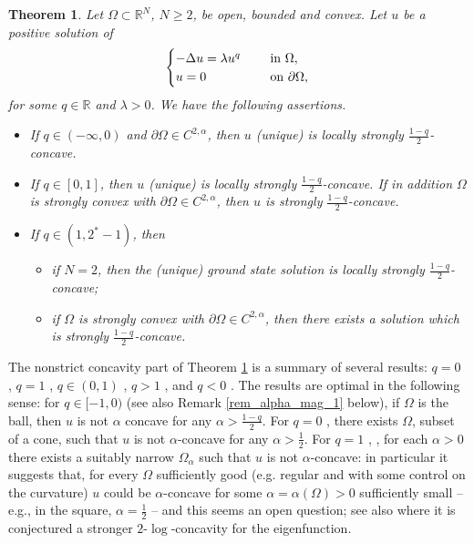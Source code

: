 \documentclass[11pt, reqno]{amsart}
\newtheorem{theorem}[lemma]{Theorem}
\theoremstyle{definition}
\numberwithin{equation}{section}
\newcommand{\R}{\mathbb{R}}
\begin{document}
\begin{theorem}
\label{thm_intr_recap}
Let $\Omega \subset \R^N$, $N \geq 2$, be open, bounded and convex. Let $u$ be a positive solution of
 $$
 \begin{cases}
-\Delta u = \lambda u^q & \quad \hbox{ in $\Omega$},\\ 
u =0 & \quad \hbox{ on $\partial \Omega$},
\end{cases}
$$
for some $q \in \R$ and $\lambda>0$. 
We have the following assertions.
\begin{itemize}
\item If $q \in (-\infty, 0)$ and $\partial \Omega \in C^{2,\alpha}$, then $u$ (unique) is locally strongly $\frac{1-q}{2}$-concave. 
\item If $q \in [0, 1]$, then $u$ (unique) is locally strongly $\frac{1-q}{2}$-concave. 
If in addition $\Omega$ is strongly convex with $\partial \Omega \in C^{2,\alpha}$, then $u$ is strongly $\frac{1-q}{2}$-concave.
\item If $q \in (1, 2^*-1) $, then 
\begin{itemize}
\item if $N=2$, then the (unique) ground state solution is locally strongly $\frac{1-q}{2}$-concave; 
\item if $\Omega$ is strongly convex with $\partial \Omega \in C^{2,\alpha}$, then there exists a solution which is strongly $\frac{1-q}{2}$-concave. 
\end{itemize}
\end{itemize}
\end{theorem}
The nonstrict concavity part of Theorem \ref{thm_intr_recap} is a summary of several results: $q=0$ \cite{MaLi71}, $q =1$ \cite{BrLi76}, $q \in (0,1)$ \cite{Ken85}, $q>1$ \cite{Lin94}, and $q<0$ \cite{BGP99}.
The results are optimal in the following sense:
for $q \in [-1,0)$ \cite[pages 329-330]{BGP99} (see also Remark \ref{rem_alpha_mag_1} below), if $\Omega$ is the ball, then $u$ is not $\alpha$ concave for any $\alpha>\frac{1-q}{2}$. 
For $q = 0$ \cite[Remark 4.2.3 and Theorem 6.2]{Ken85}, \cite[page 328]{BGP99} there exists $\Omega$, subset of a cone, such that $u$ is not $\alpha$-concave for any $\alpha>\frac{1}{2}$.
For $q=1$ \cite[Theorem 15 in Section 7]{Ken84}, \cite[pages 328-329]{BGP99}, for each $\alpha>0$ there exists a suitably narrow $\Omega_{\alpha}$ such that $u$ is not $\alpha$-concave: 
in particular it suggests that, for every $\Omega$ sufficiently good (e.g. regular and with some control on the curvature) $u$ could be $\alpha$-concave for some $\alpha=\alpha(\Omega)>0$ sufficiently small -- e.g., in the square, $\alpha=\frac{1}{2}$ -- and this seems an open question; see also \cite{IST20} where it is conjectured a stronger $2$-$\log$-concavity for the eigenfunction. 
\end{document}

